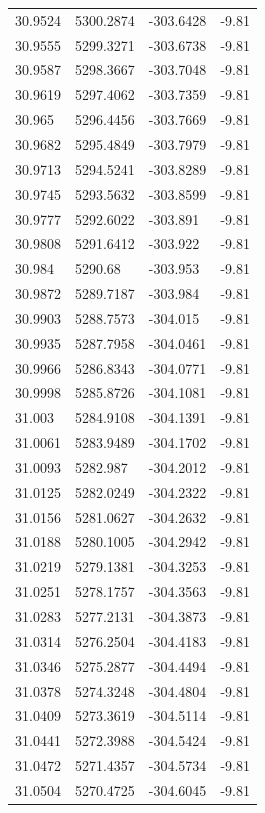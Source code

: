 \begin{table}[H]
\begin{tabular}{llll}
30.9524 & 5300.2874 & -303.6428 & -9.81 \\
30.9555 & 5299.3271 & -303.6738 & -9.81 \\
30.9587 & 5298.3667 & -303.7048 & -9.81 \\
30.9619 & 5297.4062 & -303.7359 & -9.81 \\
30.965 & 5296.4456 & -303.7669 & -9.81 \\
30.9682 & 5295.4849 & -303.7979 & -9.81 \\
30.9713 & 5294.5241 & -303.8289 & -9.81 \\
30.9745 & 5293.5632 & -303.8599 & -9.81 \\
30.9777 & 5292.6022 & -303.891 & -9.81 \\
30.9808 & 5291.6412 & -303.922 & -9.81 \\
30.984 & 5290.68 & -303.953 & -9.81 \\
30.9872 & 5289.7187 & -303.984 & -9.81 \\
30.9903 & 5288.7573 & -304.015 & -9.81 \\
30.9935 & 5287.7958 & -304.0461 & -9.81 \\
30.9966 & 5286.8343 & -304.0771 & -9.81 \\
30.9998 & 5285.8726 & -304.1081 & -9.81 \\
31.003 & 5284.9108 & -304.1391 & -9.81 \\
31.0061 & 5283.9489 & -304.1702 & -9.81 \\
31.0093 & 5282.987 & -304.2012 & -9.81 \\
31.0125 & 5282.0249 & -304.2322 & -9.81 \\
31.0156 & 5281.0627 & -304.2632 & -9.81 \\
31.0188 & 5280.1005 & -304.2942 & -9.81 \\
31.0219 & 5279.1381 & -304.3253 & -9.81 \\
31.0251 & 5278.1757 & -304.3563 & -9.81 \\
31.0283 & 5277.2131 & -304.3873 & -9.81 \\
31.0314 & 5276.2504 & -304.4183 & -9.81 \\
31.0346 & 5275.2877 & -304.4494 & -9.81 \\
31.0378 & 5274.3248 & -304.4804 & -9.81 \\
31.0409 & 5273.3619 & -304.5114 & -9.81 \\
31.0441 & 5272.3988 & -304.5424 & -9.81 \\
31.0472 & 5271.4357 & -304.5734 & -9.81 \\
31.0504 & 5270.4725 & -304.6045 & -9.81 \\

\end{tabular}
\end{table}
